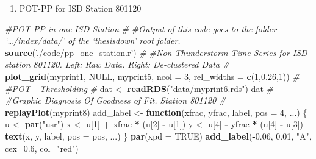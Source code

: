 \documentclass[12pt,twoside]{reedthesis}
\newenvironment{Shaded}{\begin{snugshade}}{\end{snugshade}}
\newcommand{\CommentTok}[1]{\textcolor[rgb]{0.56,0.35,0.01}{\textit{#1}}}
\newcommand{\ControlFlowTok}[1]{\textcolor[rgb]{0.13,0.29,0.53}{\textbf{#1}}}
\newcommand{\DataTypeTok}[1]{\textcolor[rgb]{0.13,0.29,0.53}{#1}}
\newcommand{\DecValTok}[1]{\textcolor[rgb]{0.00,0.00,0.81}{#1}}
\newcommand{\FloatTok}[1]{\textcolor[rgb]{0.00,0.00,0.81}{#1}}
\newcommand{\KeywordTok}[1]{\textcolor[rgb]{0.13,0.29,0.53}{\textbf{#1}}}
\newcommand{\NormalTok}[1]{#1}
\newcommand{\OperatorTok}[1]{\textcolor[rgb]{0.81,0.36,0.00}{\textbf{#1}}}
\newcommand{\OtherTok}[1]{\textcolor[rgb]{0.56,0.35,0.01}{#1}}
\newcommand{\StringTok}[1]{\textcolor[rgb]{0.31,0.60,0.02}{#1}}
\providecommand{\tightlist}{%
  \setlength{\itemsep}{0pt}\setlength{\parskip}{0pt}}
\begin{document}
\normalsize
\begin{enumerate}
\def\labelenumi{\arabic{enumi}.}
\setcounter{enumi}{2}
\tightlist
\item
  POT-PP for ISD Station 801120
\end{enumerate}
\tiny

\vspace{0.4cm}
\begin{Shaded}
\begin{Highlighting}[]
\CommentTok{#POT-PP in one ISD Station}
\CommentTok{#}
\CommentTok{#Output of this code goes to the folder ‘…/index/data/’ of the ‘thesisdown’ root folder.}
\KeywordTok{source}\NormalTok{(}\StringTok{'./code/pp_one_station.r'}\NormalTok{)}
\CommentTok{#}
\CommentTok{#Non-Thunderstorm Time Series for ISD station 801120. Left: Raw Data. Right: De-clustered Data}
\CommentTok{#}
\KeywordTok{plot_grid}\NormalTok{(myprint1, }\OtherTok{NULL}\NormalTok{, myprint5, }\DataTypeTok{ncol =} \DecValTok{3}\NormalTok{,  }\DataTypeTok{rel_widths =} \KeywordTok{c}\NormalTok{(}\DecValTok{1}\NormalTok{,}\FloatTok{0.26}\NormalTok{,}\DecValTok{1}\NormalTok{))}
\CommentTok{#}
\CommentTok{#POT - Thresholding}
\CommentTok{#}
\NormalTok{dat <-}\StringTok{ }\KeywordTok{readRDS}\NormalTok{(}\StringTok{"data/myprint6.rds"}\NormalTok{)}
\NormalTok{dat}
\CommentTok{#}
\CommentTok{#Graphic Diagnosis Of Goodness of Fit. Station 801120}
\CommentTok{#}
\KeywordTok{replayPlot}\NormalTok{(myprint8)}
\NormalTok{add_label <-}\StringTok{ }\ControlFlowTok{function}\NormalTok{(xfrac, yfrac, label, }\DataTypeTok{pos =} \DecValTok{4}\NormalTok{, ...) \{}
\NormalTok{  u <-}\StringTok{ }\KeywordTok{par}\NormalTok{(}\StringTok{"usr"}\NormalTok{)}
\NormalTok{  x <-}\StringTok{ }\NormalTok{u[}\DecValTok{1}\NormalTok{] }\OperatorTok{+}\StringTok{ }\NormalTok{xfrac }\OperatorTok{*}\StringTok{ }\NormalTok{(u[}\DecValTok{2}\NormalTok{] }\OperatorTok{-}\StringTok{ }\NormalTok{u[}\DecValTok{1}\NormalTok{])}
\NormalTok{  y <-}\StringTok{ }\NormalTok{u[}\DecValTok{4}\NormalTok{] }\OperatorTok{-}\StringTok{ }\NormalTok{yfrac }\OperatorTok{*}\StringTok{ }\NormalTok{(u[}\DecValTok{4}\NormalTok{] }\OperatorTok{-}\StringTok{ }\NormalTok{u[}\DecValTok{3}\NormalTok{])}
  \KeywordTok{text}\NormalTok{(x, y, label, }\DataTypeTok{pos =}\NormalTok{ pos, ...)}
\NormalTok{\}}
\KeywordTok{par}\NormalTok{(}\DataTypeTok{xpd =} \OtherTok{TRUE}\NormalTok{)}
\KeywordTok{add_label}\NormalTok{(}\OperatorTok{-}\FloatTok{0.06}\NormalTok{, }\FloatTok{0.01}\NormalTok{, }\StringTok{"A"}\NormalTok{, }\DataTypeTok{cex=}\FloatTok{0.6}\NormalTok{, }\DataTypeTok{col=}\StringTok{"red"}\NormalTok{)}

\end{Highlighting}
\end{Shaded}
\end{document}
